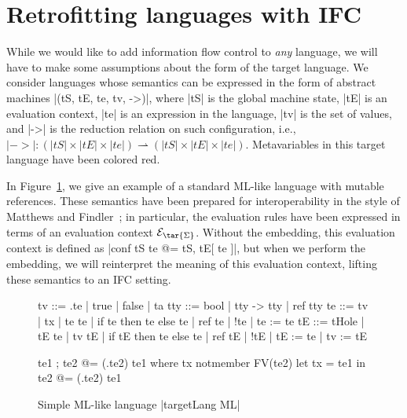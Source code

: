 \section{Retrofitting languages with IFC}
\label{sec:retrofit}

While we would like to add information flow control to \emph{any}
language, we will have to make some assumptions about the form of the
target language.  We consider languages whose semantics can be expressed
in the form of abstract machines |(tS, tE, te, tv, ->)|, where |tS| is the
global machine state, |tE| is an evaluation context, |te| is an
expression in the language, |tv| is the set of values, and |->| is the reduction relation on such
configuration, i.e., $|->| : (|tS| \times |tE| \times |te|)
\rightharpoonup (|tS| \times |tE| \times |te|)$.  Metavariables in this
target language have been colored red.

In Figure~\ref{fig:ml}, we give an example of a standard ML-like
language with mutable references.  These semantics have been prepared
for interoperability in the style of Matthews and Findler~; in
particular, the evaluation rules have been expressed in terms of an
evaluation context $\mathcal{E}_{\tar{\Sigma}}$.  Without the embedding,
this evaluation context is defined as |conf tS te @= tS, tE[ te ]|, but
when we perform the embedding, we will reinterpret the meaning
of this evaluation context, lifting these semantics to an IFC setting.

\begin{figure}
\begin{code}
tv   ::= \tx.te | true | false | ta
tty   ::= bool | tty -> tty | ref tty
te   ::= tv | tx | te te | if te then te else te | ref te | !te | te := te
tE   ::= tHole | tE te | tv tE | if tE then te else te
       | ref tE | !tE | tE := te | tv := tE 

te1 ; te2            @= (\tx.te2) te1  where  tx notmember FV(te2)
let tx = te1 in te2  @= (\tx.te2) te1
\end{code}



\caption{Simple ML-like language |targetLang ML|}
\label{fig:ml}
\end{figure}

